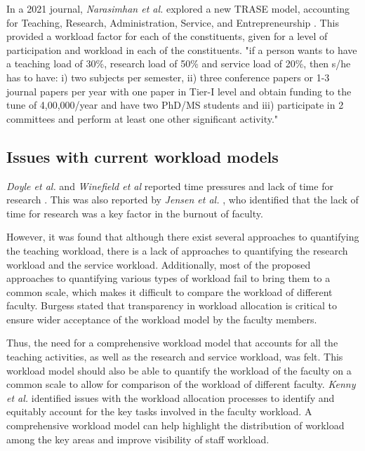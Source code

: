 In a 2021 journal, \textit{Narasimhan et al.} explored a new TRASE model, accounting for Teaching, Research, Administration, Service, and Entrepreneurship \cite{narasimhan32trase}. This provided a workload factor for each of the constituents, given for a level of participation and workload in each of the constituents. "if a person wants to have a teaching load of 30\%, research load of 50\% and service load of 20\%, then s/he has to have: i) two subjects per semester, ii) three conference papers or 1-3 journal papers per year with one paper in Tier-I level and obtain funding to the tune of 4,00,000/year and have two PhD/MS students and iii) participate in 2 committees and perform at least one other significant activity."

\subsection{Issues with current workload models}

\textit{Doyle et al.} and \textit{Winefield et al} reported time pressures and lack of time for research \cite{doyle1998occupational,winefield2003occupational}. This was also reported by \textit{Jensen et al.} \cite{jensen2009vanishing}, who identified that the lack of time for research was a key factor in the burnout of faculty.

However, it was found that although there exist several approaches to quantifying the teaching workload, there is a lack of approaches to quantifying the research workload and the service workload. Additionally, most of the proposed approaches to quantifying various types of workload fail to bring them to a common scale, which makes it difficult to compare the workload of different faculty. Burgess \cite{burgess2003academic} stated that transparency in workload allocation is critical to ensure wider acceptance of the workload model by the faculty members.

Thus, the need for a comprehensive workload model that accounts for all the teaching activities, as well as the research and service workload, was felt. This workload model should also be able to quantify the workload of the faculty on a common scale to allow for comparison of the workload of different faculty. \textit{Kenny et al.} \cite{kenny2021emerging} identified issues with the workload allocation processes to identify and equitably account for the key tasks involved in the faculty workload. A comprehensive workload model can help highlight the distribution of workload among the key areas and improve visibility of staff workload.

